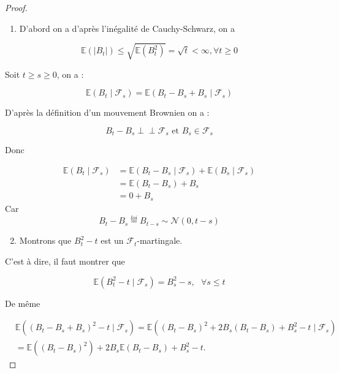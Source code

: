\documentclass[A4paper,12pt]{report}
\def\Perp{\perp\!\!\!\perp}
\begin{document}
\begin{proof}

\begin{enumerate}
  \item D'abord on a d'après l'inégalité de Cauchy-Schwarz, on a

\end{enumerate}
$$
\mathbb{E}\left(\left|B_{t}\right|\right) \leq \sqrt{\mathbb{E}\left(B_{t}^{2}\right)}=\sqrt{t}<\infty, \forall t \geq 0
$$

Soit $t \geq s \geq 0$, on a :

$$
\mathbb{E}\left(B_{t} \mid \mathcal{F}_{s}\right)=\mathbb{E}\left(B_{t}-B_{s}+B_{s} \mid \mathcal{F}_{s}\right)
$$

D'après la définition d'un mouvement Brownien  on a :

$$
B_{t}-B_{s} \Perp \mathcal{F}_{s} \text { et } B_{s} \in \mathcal{F}_{s}
$$

Donc

$$
\begin{aligned}
\mathbb{E}\left(B_{t} \mid \mathcal{F}_{s}\right) & =\mathbb{E}\left(B_{t}-B_{s} \mid \mathcal{F}_{s}\right)+\mathbb{E}\left(B_{s} \mid \mathcal{F}_{s}\right) \\
& =\mathbb{E}\left(B_{t}-B_{s}\right)+B_{s} \\
& =0+B_{s}
\end{aligned}
$$
Car $$
B_{t}-B_{s} \stackrel{l o i}{=} B_{t-s} \sim \mathcal{N}(0, t-s)
$$
\begin{enumerate}
  \setcounter{enumi}{1}
  \item Montrons que $B_{t}^{2}-t$ est un $\mathcal{F}_{t}$-martingale.
\end{enumerate}

C'est à dire, il faut montrer que

$$
\mathbb{E}\left(B_{t}^{2}-t \mid \mathcal{F}_{s}\right)=B_{s}^{2}-s, \text{  } \forall s \leq t 
$$

De même

$$
\begin{aligned}
& \mathbb{E}\left(\left(B_{t}-B_{s}+B_{s}\right)^{2}-t \mid \mathcal{F}_{s}\right)=\mathbb{E}\left(\left(B_{t}-B_{s}\right)^{2}+2 B_{s}\left(B_{t}-B_{s}\right)+B_{s}^{2}-t \mid \mathcal{F}_{s}\right) \\
& =\mathbb{E}\left(\left(B_{t}-B_{s}\right)^{2}\right)+2 B_{s} \mathbb{E}\left(B_{t}-B_{s}\right)+B_{s}^{2}-t .
\end{aligned}
$$


\end{proof}
\end{document}
